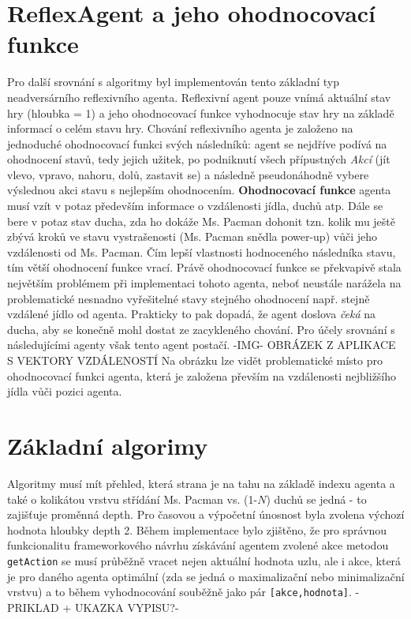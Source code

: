 \section{ReflexAgent a jeho ohodnocovací funkce}
Pro další srovnání s algoritmy byl implementován tento základní typ neadversárního reflexivního agenta. Reflexivní agent pouze vnímá aktuální stav hry (hloubka = 1) a jeho ohodnocovací funkce vyhodnocuje stav hry na základě informací o celém stavu hry. Chování reflexivního agenta je založeno na jednoduché ohodnocovací funkci svých následníků: agent se nejdříve podívá na ohodnocení stavů, tedy jejich užitek, po podniknutí všech přípustných \textit{Akcí} (jít vlevo, vpravo, nahoru, dolů, zastavit se) a následně pseudonáhodně vybere výslednou akci stavu s nejlepším ohodnocením.
\textbf{Ohodnocovací funkce} agenta musí vzít v potaz především informace o vzdálenosti jídla, duchů atp. Dále se bere v potaz stav ducha, zda ho dokáže Ms. Pacman dohonit tzn. kolik mu ještě zbývá kroků ve stavu vystrašenosti (Ms. Pacman snědla power-up) vůči jeho vzdálenosti od Ms. Pacman. Čím lepší vlastnosti hodnoceného následníka stavu, tím větší ohodnocení funkce vrací. 
Právě ohodnocovací funkce se překvapivě stala největším problémem při implementaci tohoto agenta, neboť neustále narážela na problematické nesnadno vyřešitelné stavy stejného ohodnocení např. stejně vzdálené jídlo od agenta. Prakticky to pak dopadá, že agent doslova \textit{čeká} na ducha, aby se konečně mohl dostat ze zacykleného chování. Pro účely srovnání s následujícími agenty však tento agent postačí.
-IMG- OBRÁZEK Z APLIKACE S VEKTORY VZDÁLENOSTÍ Na obrázku lze vidět problematické místo pro ohodnocovací funkci agenta, která je založena převším na vzdálenosti nejbližšího jídla vůči pozici agenta.

\section{Základní algorimy}
Algoritmy musí mít přehled, která strana je na tahu na základě indexu agenta a také o kolikátou vrstvu střídání Ms. Pacman vs. (1-$N$) duchů se jedná - to zajišťuje proměnná depth. Pro časovou a výpočetní únosnost byla zvolena výchozí hodnota hloubky depth 2. Během implementace bylo zjištěno, že pro správnou funkcionalitu frameworkového návrhu získávání agentem zvolené akce metodou \texttt{getAction} se musí průběžně vracet nejen aktuální hodnota uzlu, ale i akce, která je pro daného agenta optimální (zda se jedná o maximalizační nebo minimalizační vrstvu) a to během vyhodnocování souběžně jako pár \texttt{[akce,hodnota]}.
-PRIKLAD + UKAZKA VYPISU?-

